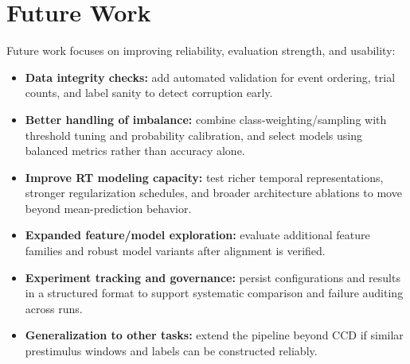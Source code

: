 \section{Future Work}
Future work focuses on improving reliability, evaluation strength, and usability:
\begin{itemize}
    \item \textbf{Data integrity checks:} add automated validation for event ordering, trial counts, and label sanity to detect corruption early.
    \item \textbf{Better handling of imbalance:} combine class-weighting/sampling with threshold tuning and probability calibration, and select models using balanced metrics rather than accuracy alone.
    \item \textbf{Improve RT modeling capacity:} test richer temporal representations, stronger regularization schedules, and broader architecture ablations to move beyond mean-prediction behavior.
    \item \textbf{Expanded feature/model exploration:} evaluate additional feature families and robust model variants after alignment is verified.
    \item \textbf{Experiment tracking and governance:} persist configurations and results in a structured format to support systematic comparison and failure auditing across runs.
    \item \textbf{Generalization to other tasks:} extend the pipeline beyond CCD if similar prestimulus windows and labels can be constructed reliably.
\end{itemize}
